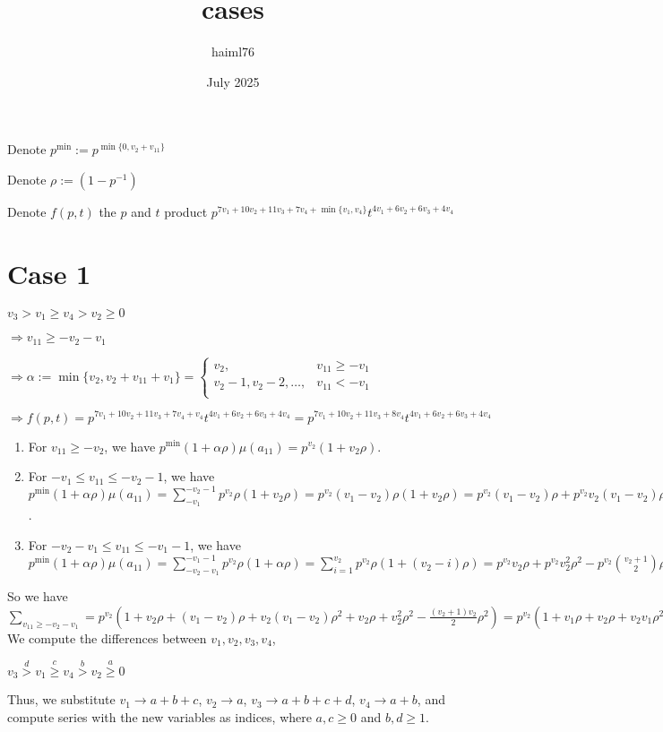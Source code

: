\documentclass{article}
\title{cases}
\author{haiml76 }
\date{July 2025}
\begin{document}
\maketitle
Denote $p^{\min}:=p^{\min\{0,v_2+v_{11}\}}$

Denote $\rho:=(1-p^{-1})$

Denote $f(p,t)$ the $p$ and $t$ product $p^{7v_1+10v_2+11v_3+7v_4+\min\{v_1,v_4\}}t^{4v_1+6v_2+6v_3+4v_4}$
\section{Case 1}
$v_3>v_1\geq{v_4}>v_2\geq{0}$

$\Rightarrow{v_{11}}\geq{-v_2-v_1}$

$\Rightarrow\alpha:=\min\{v_2,v_2+v_{11}+v_1\}=     \begin{cases}
       v_2, & v_{11}\geq{-v_1}\\
       v_2-1,v_2-2,\dots, & v_{11}<{-v_1}\\
     \end{cases}$

    $\Rightarrow{f(p,t)=p^{7v_1+10v_2+11v_3+7v_4+v_4}t^{4v_1+6v_2+6v_3+4v_4}=p^{7v_1+10v_2+11v_3+8v_4}t^{4v_1+6v_2+6v_3+4v_4}}$
\begin{enumerate}
    \item 
For $v_{11}\geq{-v_2}$, we have $p^{\min}(1+\alpha\rho)\mu(a_{11})=p^{v_2}(1+v_2\rho)$.
\item
For $-v_1\leq{v_{11}}\leq{-v_2-1}$, we have $p^{\min}(1+\alpha\rho)\mu(a_{11})=\sum_{-v_1}^{-v_2-1}p^{v_2}\rho(1+v_2\rho)=p^{v_2}(v_1-v_2)\rho(1+v_2\rho)=p^{v_2}(v_1-v_2)\rho+p^{v_2}v_2(v_1-v_2)\rho^2$.
\item
For $-v_2-v_1\leq{v_{11}}\leq{-v_1-1}$, we have $p^{\min}(1+\alpha\rho)\mu(a_{11})=\sum_{-v_2-v_1}^{-v_1-1}p^{v_2}\rho(1+\alpha\rho)=\sum_{i=1}^{v_2}p^{v_2}\rho(1+(v_2-i)\rho)=p^{v_2}v_2\rho+p^{v_2}v_2^2\rho^2-p^{v_2}\binom{v_2+1}{2}\rho^2.$
\end{enumerate}
So we have $\sum_{v_{11}\geq{-v_2-v_1}}=p^{v_2}(1+v_2\rho+(v_1-v_2)\rho+v_2(v_1-v_2)\rho^2+v_2\rho+v_2^2\rho^2-\frac{(v_2+1)v_2}{2}\rho^2)=p^{v_2}(1+v_1\rho+v_2\rho+v_2v_1\rho^2-\frac{v_2^2}{2}\rho^2-\frac{v_2}{2}\rho^2).$
We compute the differences between $v_1,v_2,v_3,v_4$,

$v_3\overset{d}{>}v_1\overset{c}{\geq}{v_4}\overset{b}>v_2\overset{a}{\geq}{0}$

Thus, we substitute $v_1\rightarrow{a+b+c}$, $v_2\rightarrow{a}$, $v_3\rightarrow{a+b+c+d}$, $v_4\rightarrow{a+b}$, and compute series with the new variables as indices, where $a,c\geq{0}$ and $b,d\geq{1}$.
\end{document}
